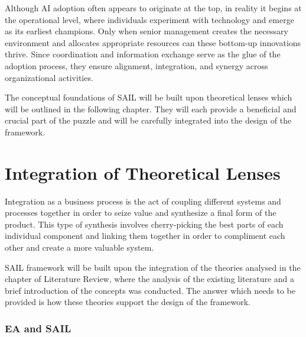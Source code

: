 \documentclass[]{imc-inf}
\begin{document}
Although AI adoption often appears to originate at the top, in reality
it begins at the operational level, where individuals experiment with
technology and emerge as its earliest champions. Only when senior
management creates the necessary environment and allocates appropriate
resources can these bottom-up innovations thrive. Since coordination and
information exchange serve as the glue of the adoption process, they
ensure alignment, integration, and synergy across organizational
activities.

The conceptual foundations of SAIL will be built upon theoretical lenses
which will be outlined in the following chapter. They will each provide
a beneficial and crucial part of the puzzle and will be carefully
integrated into the design of the framework.

\section{Integration of Theoretical
	Lenses}\label{integration-of-theoretical-lenses}


Integration as a business process is the act of coupling different
systems and processes together in order to seize value and synthesize a
final form of the product. This type of synthesis involves
cherry-picking the best parts of each individual component and linking
them together in order to compliment each other and create a more
valuable system.

SAIL framework will be built upon the integration of the theories
analysed in the chapter of Literature Review, where the analysis of the
existing literature and a brief introduction of the concepts was
conducted. The answer which needs to be provided is how these theories
support the design of the framework.

\subsubsection{EA and SAIL}\label{ea-and-sail}
\end{document}
